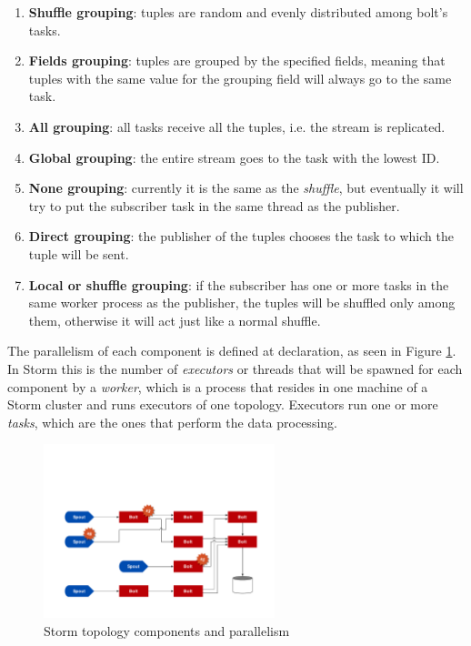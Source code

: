 \documentclass[ppgc,diss,english]{iiufrgs}
\begin{document}
\begin{enumerate}
\item \textbf{Shuffle grouping}: tuples are random and evenly distributed among bolt's tasks.
\item \textbf{Fields grouping}: tuples are grouped by the specified fields, meaning that tuples with the same value for the grouping field will always go to the same task.
\item \textbf{All grouping}: all tasks receive all the tuples, i.e. the stream is replicated.
\item \textbf{Global grouping}: the entire stream goes to the task with the lowest ID.
\item \textbf{None grouping}: currently it is the same as the \emph{shuffle}, but eventually it will try to put the subscriber task in the same thread as the publisher.
\item \textbf{Direct grouping}: the publisher of the tuples chooses the task to which the tuple will be sent.
\item \textbf{Local or shuffle grouping}: if the subscriber has one or more tasks in the same worker process as the publisher, the tuples will be shuffled only among them, otherwise it will act just like a normal shuffle.
\end{enumerate}

The parallelism of each component is defined at declaration, as seen in Figure \ref{fig:storm_topology_parallelism}. In Storm this is the number of \emph{executors} or threads that will be spawned for each component by a \emph{worker}, which is a process that resides in one machine of a Storm cluster and runs executors of one topology. Executors run one or more \emph{tasks}, which are the ones that perform the data processing.

\begin{figure}[!ht]
	\centering
	\includegraphics[width=0.6\textwidth]{images/storm/topology_parallelism.pdf}
	\caption[Storm topology components and parallelism]{Storm topology components and parallelism \cite{heinze2014cloud}}
	\label{fig:storm_topology_parallelism}
\end{figure}
\end{document}
